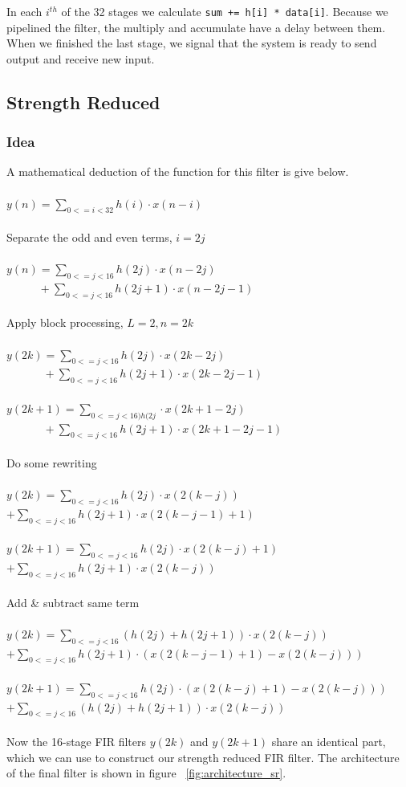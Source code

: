 In each $i^{th}$ of the 32 stages we calculate \texttt{sum += h[i] * data[i]}. Because we pipelined the filter, the multiply and accumulate have a delay between them. When we finished the last stage, we signal that the system is ready to send output and receive new input.
\subsection{Strength Reduced }
\subsubsection{Idea}
A mathematical deduction of the function for this filter is give below.\\
\\
$y(n) = \sum_{0<=i<32} h(i) \cdot x(n-i)$\\
\\
Separate the odd and even terms, $ i=2j$\\
\\
$y(n) = \sum_{0<=j<16} h(2j) \cdot x(n-2j)$\\
$\phantom{y(n)} + \sum_{0<=j<16} h(2j+1) \cdot x(n-2j-1)$\\
\\
Apply block processing, $L=2, n=2k$\\
\\
$y(2k)   = \sum_{0<=j<16} h(2j) \cdot x(2k-2j)$\\
$\phantom{y(2k)}       + \sum_{0<=j<16} h(2j+1) \cdot x(2k-2j-1)$\\
\\
$y(2k+1) = \sum_{0<=j<16) h(2j} \cdot x(2k+1-2j)$\\
$\phantom{y(2k)}        + \sum_{0<=j<16} h(2j+1) \cdot x(2k+1-2j-1)$\\
\\
Do some rewriting\\
\\
$y(2k)   = \sum_{0<=j<16} h(2j) \cdot x(2(k-j))$\\
$       + \sum_{0<=j<16} h(2j+1) \cdot x(2(k-j-1)+1)$\\
\\
$y(2k+1) = \sum_{0<=j<16} h(2j) \cdot x(2(k-j)+1)$\\
$        + \sum_{0<=j<16} h(2j+1) \cdot x(2(k-j))$\\
\\
Add \& subtract same term\\
\\
$y(2k)   = \sum_{0<=j<16} (h(2j) + h(2j+1)) \cdot x(2(k-j))$\\
$        + \sum_{0<=j<16} h(2j+1) \cdot (x(2(k-j-1)+1) - x(2(k-j)))$\\
\\
$y(2k+1) = \sum_{0<=j<16} h(2j) \cdot (x(2(k-j)+1) - x(2(k-j)))$\\
$        + \sum_{0<=j<16} (h(2j) + h(2j+1)) \cdot x(2(k-j))$\\
\\
Now the 16-stage FIR filters $y(2k)$ and $y(2k+1)$ share an identical part, which we can use to construct our strength reduced FIR filter. The architecture of the final filter is shown in figure ~\ref{fig:architecture_sr}.

